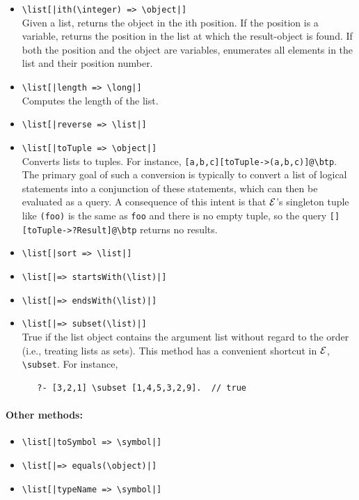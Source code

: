 \documentclass[11pt]{article}
\newcommand{\ERGO}{\mbox{\ensuremath{\cal{E}}\smaller{{\sc{RGO}}}}\xspace}
\newcommand{\FLSYSTEM}{\ERGO}
\newcommand{\bs}{\textbackslash}
\begin{document}
\begin{itemize}
\begin{verbatim}
   ?R = [a, b, c, d, e, f]
\end{verbatim}
\item {\tt \bs{}list[|ith(\bs{}integer) => \bs{}object|]}  \\
  Given a list, returns the object in the ith position. If the position is
  a variable, returns the position in the list at which the result-object
  is found. If both the position and the object are variables, enumerates
  all elements in the list and their position number.
\item {\tt \bs{}list[|length => \bs{}long|]}  
  \\
  Computes the length of the list.
\item {\tt \bs{}list[|reverse => \bs{}list|]}  
\item \texttt{\bs{}list[|toTuple => \bs{}object|]}
\\
Converts lists to tuples. For instance,
\texttt{[a,b,c][toTuple->(a,b,c)]@\bs{}btp}.  The primary goal of such  
a conversion is typically to convert a list of logical statements into a
conjunction of these statements, which can then be evaluated as a query.
A consequence of this intent is that
\FLSYSTEM's singleton tuple like \texttt{(foo)}  is the same as
\texttt{foo} and there is no empty tuple, so the query
\texttt{[][toTuple->?Result]@\bs{}btp} returns no results.
\item {\tt \bs{}list[|sort => \bs{}list|]}  
\item {\tt \bs{}list[|=> startsWith(\bs{}list)|]}  
\item {\tt \bs{}list[|=> endsWith(\bs{}list)|]}  
\item {\tt \bs{}list[|=> subset(\bs{}list)|]}  
  \\
  True if the list object contains the argument list without regard to the
  order (i.e., treating lists as sets).  This method has a convenient
  shortcut in \FLSYSTEM, \texttt{\bs{}subset}. For instance,
\begin{verbatim}
   ?- [3,2,1] \subset [1,4,5,3,2,9].  // true  
\end{verbatim}
\end{itemize}

\paragraph{Other methods:}
\begin{itemize}
\item {\tt \bs{}list[|toSymbol => \bs{}symbol|]}  
\item {\tt \bs{}list[|=> equals(\bs{}object)|]}  
\item {\tt \bs{}list[|typeName => \bs{}symbol|]}  
\end{itemize}
\end{document}
